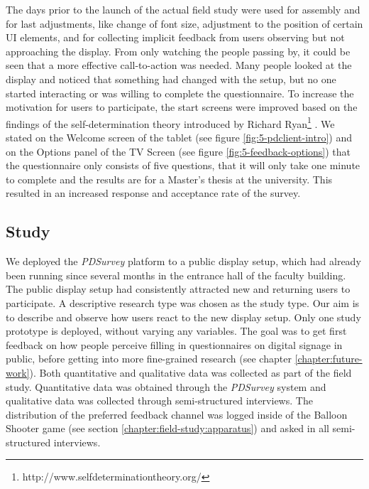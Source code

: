 	The days prior to the launch of the actual field study were used for assembly and for last adjustments, like change of font size, adjustment to the position of certain UI elements, and for collecting implicit feedback from users observing but not approaching the display. From only watching the people passing by, it could be seen that a more effective call-to-action was needed. Many people looked at the display and noticed that something had changed with the setup, but no one started interacting or was willing to complete the questionnaire. To increase the motivation for users to participate, the start screens were improved based on the findings of the self-determination theory introduced by Richard Ryan\footnote{http://www.selfdeterminationtheory.org/} \cite{ryan2000self}. We stated on the Welcome screen of the tablet (see figure \ref{fig:5-pdclient-intro}) and on the Options panel of the TV Screen (see figure \ref{fig:5-feedback-options}) that the questionnaire only consists of five questions, that it will only take one minute to complete and the results are for a Master's thesis at the university. This resulted in an increased response and acceptance rate of the survey.



	



\clearpage
\subsection{Study}

	We deployed the \textit{PDSurvey} platform to a public display setup, which had already been running since several months in the entrance hall of the faculty building. The public display setup had consistently attracted new and returning users to participate. A descriptive research type was chosen as the study type. Our aim is to describe and observe how users react to the new display setup. Only one study prototype is deployed, without varying any variables. The goal was to get first feedback on how people perceive filling in questionnaires on digital signage in public, before getting into more fine-grained research (see chapter \ref{chapter:future-work}). 
	Both quantitative and qualitative data was collected as part of the field study. Quantitative data was obtained through the \textit{PDSurvey} system and qualitative data was collected through semi-structured interviews.
	The distribution of the preferred feedback channel was logged inside of the Balloon Shooter game (see section \ref{chapter:field-study:apparatus}) and asked in all semi-structured interviews.


